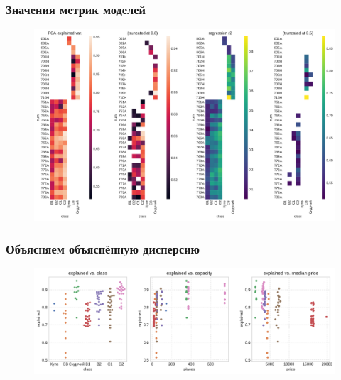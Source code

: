 \documentclass[11pt,aspectratio=169]{beamer}
\begin{document}
\begin{frame}
    \frametitle{Значения метрик моделей}

    \begin{figure}
        \centering
        \includegraphics[height=0.92\textheight]{../data/figures/model_metrics.pdf}
    \end{figure}

\end{frame}


\begin{frame}
    \frametitle{Объясняем объяснённую дисперсию}

    \begin{figure}
        \centering
        \includegraphics[width=\textwidth]{../data/figures/explaining_explained_variance.pdf}
    \end{figure}

\end{frame}
\end{document}

